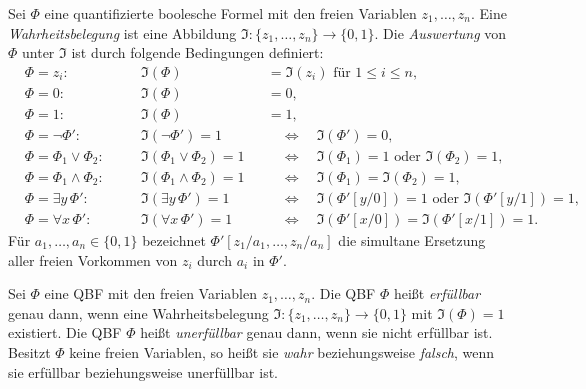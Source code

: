 \begin{Definition}
    \label{def:qbf-evaluation}
    Sei \(\Phi\) eine quantifizierte boolesche Formel mit den freien
    Variablen \(z_1,\dots,z_n\). Eine \emph{Wahrheitsbelegung} ist eine
    Abbildung
    \(
        \mathfrak{I}\colon
        \{z_1,\dots,z_n\}\to\{0,1\}.
    \)
    Die \emph{Auswertung} von \(\Phi\) unter \(\mathfrak{I}\) ist durch
    folgende Bedingungen definiert:
    \[
    \begin{alignedat}{3}
        &\Phi=z_i\colon
        \quad 
        &&\mathfrak{I}(\Phi)
        &&=\mathfrak{I}(z_i)
        \text{ für }1\leq i\leq n,\\
        &\Phi=0\colon
        \quad 
        &&\mathfrak{I}(\Phi)
        &&=0,\\
        &\Phi=1\colon
        \quad 
        &&\mathfrak{I}(\Phi)
        &&=1,\\
        &\Phi=\neg\Phi'\colon
        \quad 
        &&\mathfrak{I}(\neg\Phi')=1
        &&\quad\Longleftrightarrow\quad
        \mathfrak{I}(\Phi')=0,\\
        &\Phi=\Phi_1\lor\Phi_2\colon
        \quad 
        &&\mathfrak{I}(\Phi_1\lor\Phi_2)=1
        &&\quad\Longleftrightarrow\quad
        \mathfrak{I}(\Phi_1)=1
        \text{ oder }\mathfrak{I}(\Phi_2)=1,\\
        &\Phi=\Phi_1\land\Phi_2\colon
        \quad 
        &&\mathfrak{I}(\Phi_1\land\Phi_2)=1
        &&\quad\Longleftrightarrow\quad
        \mathfrak{I}(\Phi_1)=\mathfrak{I}(\Phi_2)=1,\\
        &\Phi=\exists y\,\Phi'\colon
        \quad 
        &&\mathfrak{I}(\exists y\,\Phi')=1
        &&\quad\Longleftrightarrow\quad
        \mathfrak{I}(\Phi'[y/0])=1
        \text{ oder }\mathfrak{I}(\Phi'[y/1])=1,\\
        &\Phi=\forall x\,\Phi'\colon
        \quad 
        &&\mathfrak{I}(\forall x\,\Phi')=1
        &&\quad\Longleftrightarrow\quad
        \mathfrak{I}(\Phi'[x/0])
        =\mathfrak{I}(\Phi'[x/1])=1.
    \end{alignedat}
    \]
    Für \(a_1,\dots,a_n\in\{0,1\}\) bezeichnet
    \(
        \Phi'[z_1/a_1,\dots,z_n/a_n]
    \)
    die simultane Ersetzung aller freien Vorkommen von \(z_i\) durch
    \(a_i\) in \(\Phi'\).
\end{Definition}

\begin{Definition}
    \label{def:qbf-satisfiability}
    Sei \(\Phi\) eine QBF mit den freien Variablen
    \(z_1,\dots,z_n\). Die QBF \(\Phi\) heißt \emph{erfüllbar} genau
    dann, wenn eine Wahrheitsbelegung
    \(\mathfrak{I}\colon\{z_1,\dots,z_n\}\to\{0,1\}\) mit
    \(\mathfrak{I}(\Phi)=1\) existiert. Die QBF \(\Phi\) heißt
    \emph{unerfüllbar} genau dann, wenn sie nicht erfüllbar ist.
    Besitzt \(\Phi\) keine freien Variablen, so heißt sie \emph{wahr}
    beziehungsweise \emph{falsch}, wenn sie erfüllbar beziehungsweise
    unerfüllbar ist.
\end{Definition}

